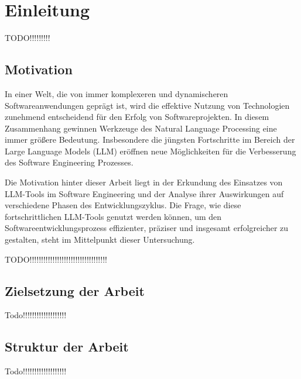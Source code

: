 
\chapter{Einleitung} 

TODO!!!!!!!!!

\section{Motivation}  \label{Motivation}

In einer Welt, die von immer komplexeren und dynamischeren Softwareanwendungen geprägt ist, wird die effektive Nutzung von Technologien zunehmend entscheidend für den Erfolg von  
Softwareprojekten. In diesem Zusammenhang gewinnen Werkzeuge des Natural Language Processing eine immer größere Bedeutung. Insbesondere die jüngsten Fortschritte im Bereich der Large  
Language Models (LLM) eröffnen neue Möglichkeiten für die Verbesserung des Software Engineering Prozesses.

Die Motivation hinter dieser Arbeit liegt in der Erkundung des Einsatzes von LLM-Tools im Software Engineering und der Analyse ihrer Auswirkungen auf verschiedene Phasen des  
Entwicklungszyklus. Die Frage, wie diese fortschrittlichen LLM-Tools genutzt werden können, um den Softwareentwicklungsprozess effizienter, präziser und insgesamt erfolgreicher zu  
gestalten, steht im Mittelpunkt dieser Untersuchung. 

TODO!!!!!!!!!!!!!!!!!!!!!!!!!!!!!!!!!!

\section{Zielsetzung der Arbeit}  \label{Zielsetzung der Arbeit}

Todo!!!!!!!!!!!!!!!!!!!

\section{Struktur der Arbeit}  \label{Struktur der Arbeit}

Todo!!!!!!!!!!!!!!!!!!!
